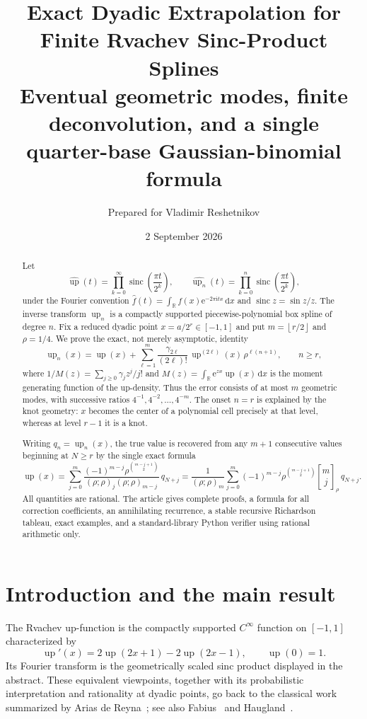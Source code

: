 \documentclass[11pt,a4paper]{article}
\title{\bfseries Exact Dyadic Extrapolation for Finite Rvachev Sinc-Product Splines\\[0.35em]
\large Eventual geometric modes, finite deconvolution, and a single quarter-base Gaussian-binomial formula}
\author{Prepared for Vladimir Reshetnikov}
\date{2 September 2026}
\theoremstyle{remark}
\newcommand{\R}{\mathbb{R}}
\newcommand{\I}{\mathrm{i}}
\newcommand{\e}{\mathrm{e}}
\newcommand{\dd}{\,\mathrm{d}}
\newcommand{\up}{\operatorname{up}}
\newcommand{\sinc}{\operatorname{sinc}}
\newcommand{\qbinom}[3]{\genfrac{[}{]}{0pt}{}{#1}{#2}_{#3}}
\newcommand{\floor}[1]{\left\lfloor #1\right\rfloor}
\begin{document}
\maketitle

\begin{abstract}
Let
\[
 \widehat{\up}(t)=\prod_{k=0}^{\infty}
 \sinc\!\left(\frac{\pi t}{2^k}\right),
 \qquad
 \widehat{\up_n}(t)=\prod_{k=0}^{n}
 \sinc\!\left(\frac{\pi t}{2^k}\right),
\]
under the Fourier convention
$\widehat f(t)=\int_{\R}f(x)\e^{-2\pi\I tx}\dd x$ and
$\sinc z=\sin z/z$.  The inverse transform $\up_n$ is a compactly
supported piecewise-polynomial box spline of degree $n$.  Fix a reduced dyadic
point $x=a/2^r\in[-1,1]$ and put $m=\floor{r/2}$ and $\rho=1/4$.
We prove the exact, not merely asymptotic, identity
\[
 \up_n(x)=\up(x)+\sum_{\ell=1}^{m}
 \frac{\gamma_{2\ell}}{(2\ell)!}\,
 \up^{(2\ell)}(x)\,\rho^{\ell(n+1)},
 \qquad n\ge r,
\]
where
$1/M(z)=\sum_{j\ge0}\gamma_jz^j/j!$ and
$M(z)=\int_{\R}\e^{zx}\up(x)\dd x$ is the moment generating function of
the up-density.  Thus the error consists of at most $m$ geometric modes, with
successive ratios $4^{-1},4^{-2},\ldots,4^{-m}$.  The onset $n=r$ is explained
by the knot geometry: $x$ becomes the center of a polynomial cell precisely at
that level, whereas at level $r-1$ it is a knot.

Writing $q_n=\up_n(x)$, the true value is recovered from any $m+1$
consecutive values beginning at $N\ge r$ by the single exact formula
\[
 \boxed{
 \up(x)=\sum_{j=0}^{m}
 \frac{(-1)^{m-j}\rho^{\binom{m-j+1}{2}}}
      {(\rho;\rho)_j(\rho;\rho)_{m-j}}\,q_{N+j}
 =\frac{1}{(\rho;\rho)_m}
 \sum_{j=0}^{m}(-1)^{m-j}\rho^{\binom{m-j+1}{2}}
 \qbinom{m}{j}{\rho}\,q_{N+j}. }
\]
All quantities are rational.  The article gives complete proofs, a formula for
all correction coefficients, an annihilating recurrence, a stable recursive
Richardson tableau, exact examples, and a standard-library Python verifier
using rational arithmetic only.
\end{abstract}

\tableofcontents

\section{Introduction and the main result}

The Rvachev up-function is the compactly supported $C^\infty$ function on
$[-1,1]$ characterized by
\begin{equation}
 \up'(x)=2\up(2x+1)-2\up(2x-1),
 \qquad \up(0)=1.
 \label{eq:refinement-derivative}
\end{equation}
Its Fourier transform is the geometrically scaled sinc product displayed in
the abstract.  These equivalent viewpoints, together with its probabilistic
interpretation and rationality at dyadic points, go back to the classical work
summarized by Arias de Reyna~\cite{Arias1982,Arias2018}; see also
Fabius~\cite{Fabius1966} and Haugland~\cite{Haugland2016}.
\end{document}
